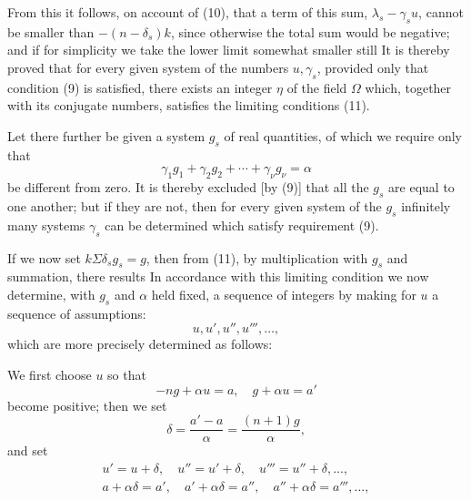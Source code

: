 From this it follows, on account of (10), that a term of this sum, $\lambda_s - \gamma_s u$, cannot be smaller than $-(n - \delta_s) k$, since otherwise the total sum would be negative; and if for simplicity we take the lower limit somewhat smaller still
It is thereby proved that for every given system of the numbers $u, \gamma_s$, provided only that condition (9) is satisfied, there exists an integer $\eta$ of the field $\Omega$ which, together with its conjugate numbers, satisfies the limiting conditions (11).

Let there further be given a system $g_s$ of real quantities, of which we require only that
\[
\gamma_1 g_1 + \gamma_2 g_2 + \cdots + \gamma_\nu g_\nu = \alpha
\]
be different from zero. It is thereby excluded [by (9)] that all the $g_s$ are equal to one another; but if they are not, then for every given system of the $g_s$ infinitely many systems $\gamma_s$ can be determined which satisfy requirement (9).

If we now set $k \Sigma \delta_s g_s = g$, then from (11), by multiplication with $g_s$ and summation, there results
In accordance with this limiting condition we now determine, with $g_s$ and $\alpha$ held fixed, a sequence of integers
by making for $u$ a sequence of assumptions:
\[
u, u', u'', u''', \dots,
\]
which are more precisely determined as follows:

We first choose $u$ so that
\[
-n g + \alpha u = a, \quad g + \alpha u = a'
\]
become positive; then we set
\[
\delta = \frac{a' - a}{\alpha} = \frac{(n+1)g}{\alpha},
\]
and set
\[
\begin{gathered}
u' = u + \delta, \quad u'' = u' + \delta, \quad u''' = u'' + \delta, \dots,\\
a + \alpha\delta = a', \quad a' + \alpha\delta = a'', \quad a'' + \alpha\delta = a''', \dots,
\end{gathered}
\]
